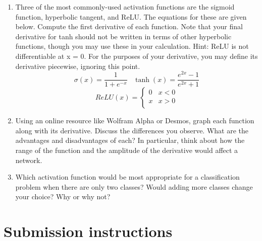 \begin{exercise}

    \begin{enumerate}
    \item Three of the most commonly-used activation functions are the sigmoid function, hyperbolic tangent, and ReLU.  The equations for these are given below.  Compute the first derivative of each function.  Note that your final derivative for tanh should not be written in terms of other hyperbolic functions, though you may use these in your calculation. Hint: ReLU is not differentiable at x = 0.  For the purposes of your derivative, you may define its derivative piecewise, ignoring this point.
    \[\sigma(x) = \frac{1}{1+e^{-x}}\,\,\,\,\,\tanh(x) = \frac{e^{2x} - 1}{e^{2x} + 1}\]
    \[ReLU(x) =   \left\{
\begin{array}{ll}
      0 & x < 0 \\
      x & x > 0 \\
\end{array} 
\right. \]
    
    \item Using an online resource like Wolfram Alpha or Desmos, graph each function along with its derivative.  Discuss the differences you observe.  What are the advantages and disadvantages of each?  In particular, think about how the range of the function and the amplitude of the derivative would affect a network.
    
    \item Which activation function would be most appropriate for a classification problem when there are only two classes?  Would adding more classes change your choice?  Why or why not?
  \end{enumerate}
    
\end{exercise}


\begin{solution}
\end{solution}



\section*{Submission instructions}



